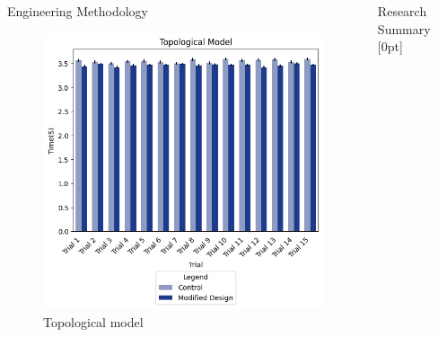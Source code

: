 \documentclass[final, 16pt]{beamer}
\newlength{\colwidth}
\newlength{\twocolwidth}
\begin{document}
\begin{frame}[t]
\begin{columns}[t]
\begin{column}{\twocolwidth}
\begin{block}{Engineering Methodology}
\begin{minipage}[t]{0.48\linewidth}
\begin{multicols}{2}
        \subheader{\hphantom{A}}
        \vspace{-0.3cm}
        \begin{figure}[H]
          \centering
          \includegraphics[width=1.05\linewidth, height=1.25\linewidth]{img/Topological_Model_Benchmark.png}
          \caption{Topological model}
          \label{fig:topological-model-benchmark}
        \end{figure}
      \end{multicols}
    \end{minipage}    

  \end{block}

\end{column}

\separatorcolumn

\begin{column}{\colwidth}

  \begin{block}{Research Summary}
    [0pt]


\end{block}
\end{column}
\end{columns}
\end{frame}
\end{document}
